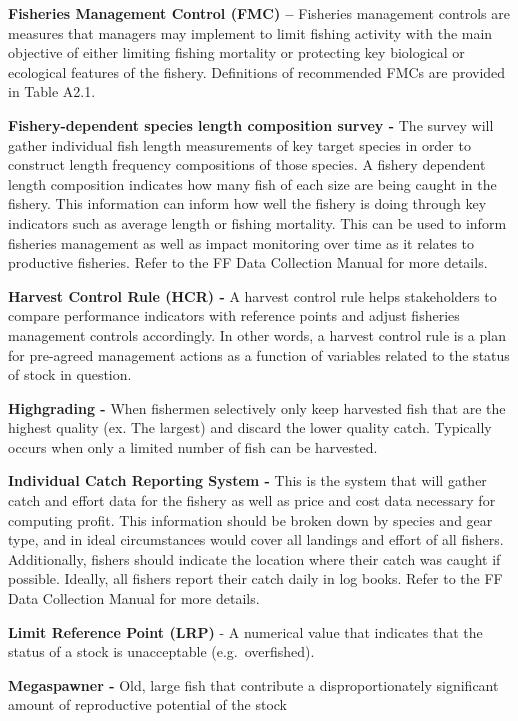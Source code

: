 \documentclass[]{book}
\begin{document}
\textbf{Fisheries Management Control (FMC) --} Fisheries management
controls are measures that managers may implement to limit fishing
activity with the main objective of either limiting fishing mortality or
protecting key biological or ecological features of the fishery.
Definitions of recommended FMCs are provided in Table A2.1.

\textbf{Fishery-dependent species length composition survey -} The
survey will gather individual fish length measurements of key target
species in order to construct length frequency compositions of those
species. A fishery dependent length composition indicates how many fish
of each size are being caught in the fishery. This information can
inform how well the fishery is doing through key indicators such as
average length or fishing mortality. This can be used to inform
fisheries management as well as impact monitoring over time as it
relates to productive fisheries. Refer to the FF Data Collection Manual
for more details.

\textbf{Harvest Control Rule (HCR) -} A harvest control rule helps
stakeholders to compare performance indicators with reference points and
adjust fisheries management controls accordingly. In other words, a
harvest control rule is a plan for pre-agreed management actions as a
function of variables related to the status of stock in question.

\textbf{Highgrading -} When fishermen selectively only keep harvested
fish that are the highest quality (ex. The largest) and discard the
lower quality catch. Typically occurs when only a limited number of fish
can be harvested.

\textbf{Individual Catch Reporting System -} This is the system that
will gather catch and effort data for the fishery as well as price and
cost data necessary for computing profit. This information should be
broken down by species and gear type, and in ideal circumstances would
cover all landings and effort of all fishers. Additionally, fishers
should indicate the location where their catch was caught if possible.
Ideally, all fishers report their catch daily in log books. Refer to the
FF Data Collection Manual for more details.

\textbf{Limit Reference Point (LRP)} - A numerical value that indicates
that the status of a stock is unacceptable (e.g.~overfished).

\textbf{Megaspawner -} Old, large fish that contribute a
disproportionately significant amount of reproductive potential of the
stock
\end{document}
